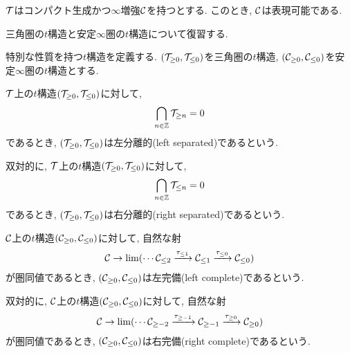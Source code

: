 \documentclass[uplatex, a4paper, 14Q, dvipdfmx]{jsarticle}
\begin{document}
\begin{theorem}[HA 1.4.4.2, 1.4.4.3]
  $\mathcal{T}$はコンパクト生成かつ$\infty$増強$\mathcal{C}$を持つとする.
  このとき, $\mathcal{C}$は表現可能である. 
\end{theorem}

三角圏の$t$構造と安定$\infty$圏の$t$構造について復習する.

\begin{definition}[三角圏の$t$構造]
  
\end{definition}

\begin{definition}[安定$\infty$圏の$t$構造]
  
\end{definition}

特別な性質を持つ$t$構造を定義する. 
$(\mathcal{T}_{\geq 0}, \mathcal{T}_{\leq 0})$を三角圏の$t$構造, $(\mathcal{C}_{\geq 0}, \mathcal{C}_{\leq 0})$を安定$\infty$圏の$t$構造とする. 

\begin{definition}[分離的]
  $\mathcal{T}$上の$t$構造$(\mathcal{T}_{\geq 0}, \mathcal{T}_{\leq 0})$に対して, 
  \begin{align*}
    \bigcap_{n \in \mathbb{Z}} \mathcal{T}_{\geq n} = 0
  \end{align*}
  であるとき, $(\mathcal{T}_{\geq 0}, \mathcal{T}_{\leq 0})$は左分離的(left separated)であるという. 

  双対的に, $\mathcal{T}$上の$t$構造$(\mathcal{T}_{\geq 0}, \mathcal{T}_{\leq 0})$に対して,
  \begin{align*}
    \bigcap_{n \in \mathbb{Z}} \mathcal{T}_{\leq n} = 0
  \end{align*}
  であるとき, $(\mathcal{T}_{\geq 0}, \mathcal{T}_{\leq 0})$は右分離的(right separated)であるという.  
\end{definition}

\begin{definition}[完備]
  $\mathcal{C}$上の$t$構造$(\mathcal{C}_{\geq 0}, \mathcal{C}_{\leq 0})$に対して, 自然な射
  \begin{align*}
    \mathcal{C} \to \lim (\cdots \mathcal{C}_{\leq 2} \xrightarrow{\tau_{\leq 1}} \mathcal{C}_{\leq 1} \xrightarrow{\tau_{\leq 0}} \mathcal{C}_{\leq 0})
  \end{align*}
  が圏同値であるとき, $(\mathcal{C}_{\geq 0}, \mathcal{C}_{\leq 0})$は左完備(left complete)であるという. 

  双対的に,   $\mathcal{C}$上の$t$構造$(\mathcal{C}_{\geq 0}, \mathcal{C}_{\leq 0})$に対して, 自然な射
  \begin{align*}
    \mathcal{C} \to \lim (\cdots \mathcal{C}_{\geq -2} \xrightarrow{\tau_{\geq -1}} \mathcal{C}_{\geq -1} \xrightarrow{\tau_{\geq 0}} \mathcal{C}_{\geq 0})
  \end{align*}
  が圏同値であるとき, $(\mathcal{C}_{\geq 0}, \mathcal{C}_{\leq 0})$は右完備(right complete)であるという.
\end{definition}
\end{document}
